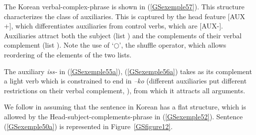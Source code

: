 \documentclass[output=paper
                ,modfonts
                ,nonflat
	        ,collection
	        ,collectionchapter
	        ,collectiontoclongg
 	        ,biblatex
                ,babelshorthands
                ,newtxmath
                ,draftmode
                ,colorlinks, citecolor=brown
]{./langsci/langscibook}
\begin{document}
{The Korean verbal-complex-phrase is shown in (\ref{GSexemple57}). This structure characterizes the class of auxiliaries. This is captured by the head feature [AUX +], which differentiates auxiliaries from control verbs, which are [AUX-]. Auxiliaries attract both the subject (list ) and the complements of their verbal complement (list ). Note the use of `$\bigcirc$', the shuffle operator, which allows reordering of the elements of the two lists.

\begin{exe}
    \label{GSexemple57}
\end{exe}

The auxiliary \textit{iss-} in (\ref{GSexemple55a}), (\ref{GSexemple56a}) takes as its complement a light verb which is constrained to end in \textit{–ko} (different auxiliaries put different restrictions on their verbal complement, \citealt{Yoo2003}), from which it attracts all arguments. 

We follow \cite{CC1998} in assuming that the sentence in Korean has a flat structure, which is allowed by the Head-subject-complements-phrase in (\ref{GSexemple52}). Sentence (\ref{GSexemple50a}) is represented in Figure~\ref{GSfigure12}.

}
\end{document}
